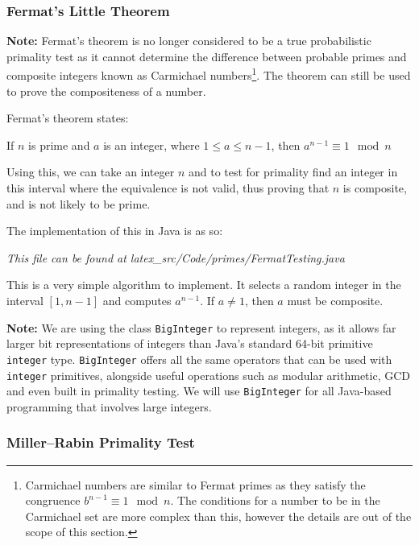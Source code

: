    \subsubsection{Fermat's Little Theorem}
    \label{subsubsec:fermat}
    
    \textbf{Note:} Fermat's theorem is no longer considered to be a true probabilistic primality test as it cannot determine the difference between probable primes and composite integers known as Carmichael numbers\footnote{Carmichael numbers are similar to Fermat primes as they satisfy the congruence $b^{n-1} \equiv 1 \mod{n}$. The conditions for a number to be in the Carmichael set are more complex than this, however the details are out of the scope of this section.}. The theorem can still be used to prove the compositeness of a number.
    
    Fermat's theorem states:
    
    \begin{center}
      If $n$ is prime and $a$ is an integer, where $1 \leq a \leq n - 1$, then
      $a^{n-1} \equiv 1 \mod{n}$
    \end{center}
    
    Using this, we can take an integer $n$ and to test for primality find an integer in this interval where the equivalence is not valid, thus proving that $n$ is composite, and is not likely to be prime.
    
    The implementation of this in Java is as so:
    
    \lstset{language=Java}
    
    
    \emph{This file can be found at latex\_src/Code/primes/FermatTesting.java}
    
    This is a very simple algorithm to implement. It selects a random integer in the interval $[1,n-1]$ and computes $a^{n-1}$. If $a \neq 1$, then $a$ must be composite.
    
    \textbf{Note:} We are using the class \verb!BigInteger! to represent integers, as it allows far larger bit representations of integers than Java's standard 64-bit primitive \verb!integer! type. \verb!BigInteger! offers all the same operators that can be used with \verb!integer! primitives, alongside useful operations such as modular arithmetic, GCD and even built in primality testing. We will use \verb!BigInteger! for all Java-based programming that involves large integers.
    
    \subsubsection{Miller--Rabin Primality Test}
    
